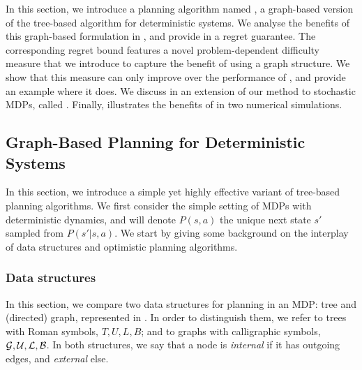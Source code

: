 In this section, we introduce a planning algorithm named \GBOPD, a graph-based version of the tree-based \OPD algorithm for deterministic systems. We analyse the benefits of this graph-based formulation in , and provide in  a regret guarantee. The corresponding regret bound features a novel problem-dependent difficulty measure that we introduce to capture the benefit of using a graph structure. We show that this measure can only improve over the performance of \OPD, and provide an example where it does. We discuss in  an extension of our method to stochastic MDPs, called \GBOP. Finally,  illustrates the benefits of \GBOP in two numerical simulations.

\subsection{Graph-Based Planning for Deterministic Systems}
\label{sec:gbopd}

In this section, we introduce a simple yet highly effective variant of tree-based planning algorithms. We first consider the simple setting of \glspl{MDP} with deterministic dynamics, and will denote $P(s,a)$ the unique next state $s'$ sampled from $P\left(s'|s,a\right)$.
We start by giving some background on the interplay of data structures and optimistic planning algorithms.

\subsubsection{Data structures}

In this section, we compare two data structures for planning in an MDP: tree and (directed) graph, represented in . In order to distinguish them, we refer to trees with Roman symbols, \eg $T, U, L, B$; and to graphs with calligraphic symbols, \eg $\mathcal{G}, \mathcal{U}, \mathcal{L}, \mathcal{B}$. In both structures, we say that a node is \emph{internal} if it has outgoing edges, and \emph{external} else.

